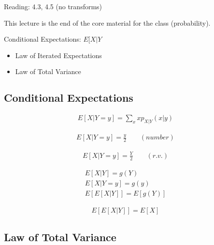 

Reading: 4.3, 4.5 (no transforms)

This lecture is the end of the core material for the class (probability).

Conditional Expectations: $E[X|Y$
\begin{itemize}
    \item Law of Iterated Expectations
    \item Law of Total Variance
\end{itemize}

\subsection{Conditional Expectations}


\begin{align}
    E[X|Y=y]= \sum_x x p_{X|Y}(x|y)
\end{align}

\begin{align*}
    E[X|Y=y]=\frac{y}{2} \qquad (number)
\end{align*}

\begin{align*}
    E[X|Y=y]=\frac{Y}{2} \qquad (r.v.)
\end{align*}


\begin{align*}
    E[X|Y]=g(Y)\\
    E[X|Y=y]=g(y)\\
    E[E[X|Y]]=E[g(Y)]
\end{align*}

\begin{align}
E[E[X|Y]]=E[X]
\label{eq:law_iter_ex}
\end{align}

\subsection{Law of Total Variance}

